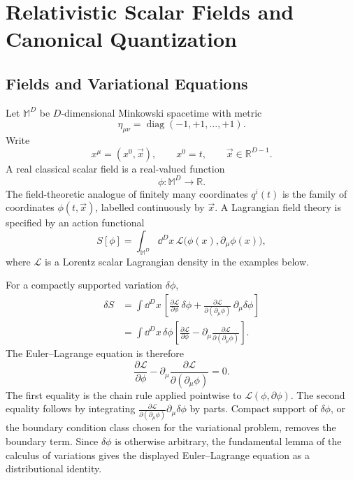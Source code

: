 \chapter{Relativistic Scalar Fields and Canonical Quantization}
\label{ch:relativistic-scalar-fields-canonical-quantization}
\ConventionsLorentzian


\section{Fields and Variational Equations}

\begin{definition}
\label{def:classical-scalar-lagrangian-field-datum}
Let \(\mathbb M^D\) be \(D\)-dimensional Minkowski spacetime with metric
\[
  \eta_{\mu\nu}=\operatorname{diag}(-1,+1,\ldots,+1).
\]
Write
\[
  x^\mu=(x^0,\vec x),\qquad x^0=t,\qquad \vec x\in\mathbb R^{D-1}.
\]
A real classical scalar field is a real-valued function
\[
  \phi:\mathbb M^D\to\mathbb R.
\]
The field-theoretic analogue of finitely many coordinates \(q^i(t)\) is the
family of coordinates \(\phi(t,\vec x)\), labelled continuously by
\(\vec x\). A Lagrangian field theory is specified by an action functional
\[
  S[\phi]
  =
  \int_{\mathbb M^D}\dd^D x\,
  \mathcal L\bigl(\phi(x),\partial_\mu\phi(x)\bigr),
\]
where \(\mathcal L\) is a Lorentz scalar Lagrangian density in the examples
below.
\end{definition}

For a compactly supported variation \(\delta\phi\),
\[
\begin{aligned}
  \delta S
  &=
  \int\dd^Dx\,
  \left[
    \frac{\partial\mathcal L}{\partial\phi}\,\delta\phi
    +
    \frac{\partial\mathcal L}
         {\partial(\partial_\mu\phi)}
    \,\partial_\mu\delta\phi
  \right]  \\
  &=
  \int\dd^Dx\,\delta\phi
  \left[
    \frac{\partial\mathcal L}{\partial\phi}
    -
    \partial_\mu
    \frac{\partial\mathcal L}
         {\partial(\partial_\mu\phi)}
  \right].
\end{aligned}
\]
The Euler--Lagrange equation is therefore
\[
  \frac{\partial\mathcal L}{\partial\phi}
  -
  \partial_\mu
  \frac{\partial\mathcal L}{\partial(\partial_\mu\phi)}
  =
  0.
\]
The first equality is the chain rule applied pointwise to
\(\mathcal L(\phi,\partial\phi)\).  The second equality follows by integrating
\(\frac{\partial\mathcal L}{\partial(\partial_\mu\phi)}\partial_\mu\delta\phi\)
by parts.  Compact support of \(\delta\phi\), or the boundary condition class
chosen for the variational problem, removes the boundary term.  Since
\(\delta\phi\) is otherwise arbitrary, the fundamental lemma of the calculus
of variations gives the displayed Euler--Lagrange equation as a distributional
identity.

